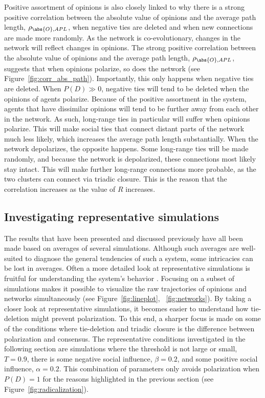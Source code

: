 \documentclass[11pt]{article}
\DeclarePairedDelimiter{\abs}\lvert\rvert
\begin{document}
\noindent Positive assortment of opinions is also closely linked to why there is a strong positive correlation between the absolute value of opinions and the average path length, $\rho_{\abs{O},APL}$, when negative ties are deleted and when new connections are made more randomly. As the network is co-evolutionary, changes in the network will reflect changes in opinions. The strong positive correlation between the absolute value of opinions and the average path length, $\rho_{\abs{O},APL}$, suggests that when opinions polarize, so does the network (see Figure~\ref{fig:corr_abs_path}).
Importantly, this only happens when negative ties are deleted. When $P(D) \gg 0$, negative ties will tend to be deleted when the opinions of agents polarize. Because of the positive assortment in the system, agents that have dissimilar opinions will tend to be further away from each other in the network. As such, long-range ties in particular will suffer when opinions polarize. This will make social ties that connect distant parts of the network much less likely, which increases the average path length substantially. When the network depolarizes, the opposite happens. Some long-range ties will be made randomly, and because the network is depolarized, these connections most likely stay intact. This will make further long-range connections more probable, as the two clusters can connect via triadic closure. This is the reason that the correlation increases as the value of $R$ increases. 

\subsection{Investigating representative simulations}
The results that have been presented and discussed previously have all been made based on averages of several simulations. Although such averages are well-suited to diagnose the general tendencies of such a system, some intricacies can be lost in averages. Often a more detailed look at representative simulations is fruitful for understanding the system's behavior \cite{turner_paths_2018}. Focusing on a subset of simulations makes it possible to visualize the raw trajectories of opinions and networks simultaneously (see Figure~\ref{fig:lineplot}, ~\ref{fig:networks}). By taking a closer look at representative simulations, it becomes easier to understand how tie-deletion might prevent polarization. To this end, a sharper focus is made on some of the conditions where tie-deletion and triadic closure is the difference between polarization and consensus. The representative conditions investigated in the following section are simulations where the threshold is not large or small, $T = 0.9$, there is some negative social influence, $\beta = 0.2$, and some positive social influence, $\alpha = 0.2$. This combination of parameters only avoids polarization when $P(D) = 1$ for the reasons highlighted in the previous section (see Figure~\ref{fig:radicalization}). 
\end{document}

